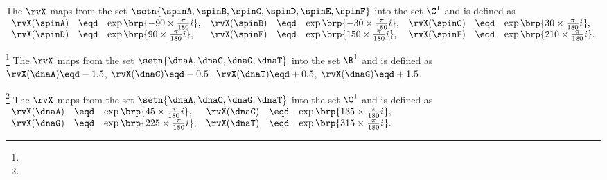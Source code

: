 \begin{definition}
\label{def:rv_spinqpsk}
The  $\rvX$ maps from the set $\setn{\spinA,\spinB,\spinC,\spinD,\spinE,\spinF}$ into the set $\C^1$
and is defined as 
\\\indentx$\begin{array}{rclrclrcl}
    \rvX(\spinA) &\eqd& \exp\brp{-90\times\frac{\pi}{180}i}, 
   &\rvX(\spinB) &\eqd& \exp\brp{-30\times\frac{\pi}{180}i}, 
   &\rvX(\spinC) &\eqd& \exp\brp{ 30\times\frac{\pi}{180}i}, 
  \\\rvX(\spinD) &\eqd& \exp\brp{ 90\times\frac{\pi}{180}i}, 
   &\rvX(\spinE) &\eqd& \exp\brp{150\times\frac{\pi}{180}i},
   &\rvX(\spinF) &\eqd& \exp\brp{210\times\frac{\pi}{180}i}.
\end{array}$
\end{definition}

\begin{definition}
\footnote{
  }
\label{def:rv_dnapam}
The  $\rvX$ maps from the set $\setn{\dnaA,\dnaC,\dnaG,\dnaT}$ into the set $\R^1$
and is defined as\footnotemark
\\\indentx
  $\rvX(\dnaA)\eqd-1.5$, 
  $\rvX(\dnaC)\eqd-0.5$, 
  $\rvX(\dnaT)\eqd+0.5$, 
  $\rvX(\dnaG)\eqd+1.5$. 
\end{definition}

\begin{definition}
\footnote{
  }
\label{def:rv_dnaqpsk}
The  $\rvX$ maps from the set $\setn{\dnaA,\dnaC,\dnaG,\dnaT}$ into the set $\C^1$
and is defined as 
\\\indentx$\begin{array}{rclrcl}
     \rvX(\dnaA) &\eqd& \exp\brp{ 45\times\frac{\pi}{180}i}, 
    &\rvX(\dnaC) &\eqd& \exp\brp{135\times\frac{\pi}{180}i}, 
   \\\rvX(\dnaG) &\eqd& \exp\brp{225\times\frac{\pi}{180}i}, 
    &\rvX(\dnaT) &\eqd& \exp\brp{315\times\frac{\pi}{180}i}.
\end{array}$
\end{definition}


